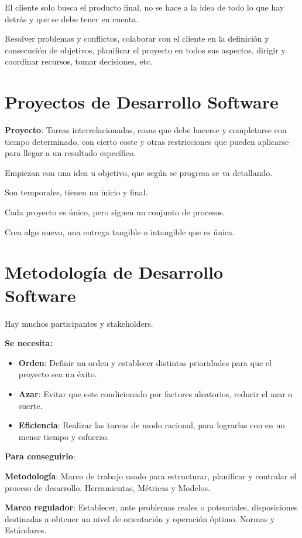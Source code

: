 \documentclass[12pt]{report} %
\begin{document}
El cliente solo busca el producto final, no se hace a la idea de todo lo
que hay detrás y que se debe tener en cuenta.

Resolver problemas y conflictos, colaborar con el cliente en la
definición y consecución de objetivos, planificar el proyecto en todos
sus aspectos, dirigir y coordinar recursos, tomar decisiones, etc.

\section{Proyectos de Desarrollo Software}

\textbf{Proyecto}: Tareas interrelacionadas, cosas que debe hacerse y
completarse con tiempo determinado, con cierto coste y otras
restricciones que pueden aplicarse para llegar a un resultado
específico.

Empiezan con una idea u objetivo, que según se progresa se va
detallando.

Son temporales, tienen un inicio y final.

Cada proyecto es único, pero siguen un conjunto de procesos.

Crea algo nuevo, una entrega tangible o intangible que es única.

\section{Metodología de Desarrollo
Software}

Hay muchos participantes y stakeholders.

\textbf{Se necesita:}

\begin{itemize}

\item
  \textbf{Orden}: Definir un orden y establecer distintas prioridades
  para que el proyecto sea un éxito.
\item
  \textbf{Azar}: Evitar que este condicionado por factores aleatorios,
  reducir el azar o suerte.
\item
  \textbf{Eficiencia}: Realizar las tareas de modo racional, para
  lograrlas con en un menor tiempo y esfuerzo.
\end{itemize}

\textbf{Para conseguirlo}:

\textbf{Metodología}: Marco de trabajo usado para estructurar,
planificar y contralar el proceso de desarrollo. Herramientas, Métricas
y Modelos.

\textbf{Marco regulador}: Establecer, ante problemas reales o
potenciales, disposiciones destinadas a obtener un nivel de orientación
y operación óptimo. Normas y Estándares.
\end{document}
